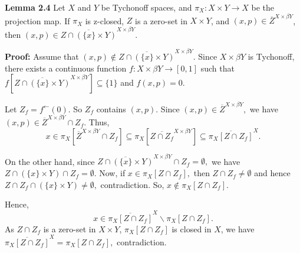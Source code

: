 \documentclass{article}
\begin{document}
\textbf{Lemma 2.4}  Let $X$ and $Y$ be Tychonoff spaces, and $\pi_X: X\times Y\rightarrow X$ be the projection map. If $\pi_X$ is z-closed, $Z$ is a zero-set in $X\times Y$, and $(x,p)\in \overline{Z}^{X\times \beta Y}$, then $(x,p)\in \overline{Z\cap \left(\{x\}\times Y\right)}^{X\times \beta Y}$.

\vskip 20pt
 
\textbf{Proof: }Assume that $(x,p)\notin \overline{Z\cap (\{x\}\times Y)}^{X\times \beta Y}.$ Since $X\times \beta Y$ is Tychonoff, there exists a continuous function $f: X\times \beta Y \rightarrow [0,1]$ such that $f\left[\overline{Z\cap (\{x\}\times Y)}^{X\times \beta Y}\right] \subseteq \{1\}$ and $f(x,p)=0$. 

\vskip 15pt

Let $Z_f=f^{\leftarrow}(0).$ So $Z_f$ contains $(x,p)$. Since $(x,p)\in \overline{Z}^{X\times \beta Y},$ we have $(x,p)\in \overline{Z}^{X\times \beta Y} \cap Z_f$. Thus, 
$$x\in \pi_X\left[\overline{Z}^{X\times \beta Y} \cap Z_f\right] \subseteq \pi_X\left[\overline{Z\cap Z_f}^{X\times \beta Y}\right] \subseteq \overline{\pi_X\left[Z\cap Z_f\right]}^X.$$

\vskip 10pt

On the other hand, since $\overline{Z\cap(\{x\}\times Y)}^{X\times \beta Y} \cap Z_f = \emptyset, $ 
we have $Z\cap (\{x\}\times Y) \cap Z_f=\emptyset$. Now, if $x\in \pi_X\left[Z\cap Z_f\right],$ then $Z\cap Z_f\neq \emptyset$ and hence 
$Z\cap Z_f\cap (\{x\}\times Y) \neq \emptyset,$  contradiction. So, $x\notin \pi_X\left[Z\cap Z_f\right]$.

\vskip 20pt

Hence, $$x\in \overline{\pi_X\left[Z\cap Z_f\right]}^X \backslash \pi_X\left[Z\cap Z_f\right].$$
\vskip 5pt
As $Z\cap Z_f$ is a zero-set in $X\times Y$, $\pi_X\left[Z\cap Z_f\right]$ is closed in $X$, we have  $\overline{\pi_X\left[Z\cap Z_f\right]}^X = \pi_X\left[Z\cap Z_f\right],$ contradiction.
\end{document}
